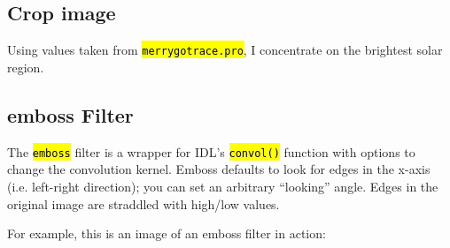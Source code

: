 \documentclass[10pt]{article}
\begin{document}
    \subsection{Crop image} %
    \label{sub:crop_image}
    Using values taken from \hl{\texttt{merrygotrace.pro}}, I concentrate on the brightest solar region.

    \subsection{emboss Filter}
    \label{sub:emboss_filter}
    The \hl{\texttt{emboss}} filter is a wrapper for IDL's \hl{\texttt{convol()}} function with options to change the convolution kernel. Emboss defaults to look for edges in the x-axis (i.e. left-right direction); you can set an arbitrary ``looking'' angle. Edges in the original image are straddled with high/low values. 

    For example, this is an image of an emboss filter in action:
\end{document}

